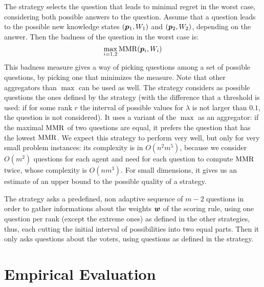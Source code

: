The  strategy selects the question that leads to minimal regret in the worst case, considering both possible answers to the question. Assume that a question leads to the possible new knowledge states $({\bm{p}}_1, W_1)$ and $({\bm{p}}_2, W_2)$, depending on the answer. Then the badness of the question in the worst case is:
\[\max_{i=1,2} \operatorname{MMR}({\bm{p}}_i,W_i) \]
This badness measure gives a way of picking questions among a set of possible questions, by picking one that minimizes the measure. Note that other aggregators than $\max$ can be used as well. The  strategy considers as possible questions the ones defined by the  strategy (with the difference that a threshold is used: if for some rank $r$ the interval of possible values for $\lambda$ is not larger than $0.1$, the question is not considered). It uses a variant of the $\max$ as an aggregator: if the maximal $\operatorname{MMR}$ of two questions are equal, it prefers the question that has the lowest $\operatorname{MMR}$. We expect this strategy to perform very well, but only for very small problem instances: its complexity is in $O(n^2 m^5)$, because we consider $O(m^2)$ questions for each agent and need for each question to compute $\operatorname{MMR}$ twice, whose complexity is $O(nm^3)$. For small dimensions, it gives us an estimate of an upper bound to the possible quality of a strategy.

The  strategy asks a predefined, non adaptive sequence of $m-2$ questions in order to gather informations about the weights $\bm{w}$ of the scoring rule, using one question per rank (except the extreme ones) as defined in the other strategies, thus, each cutting the initial interval of possibilities into two equal parts. Then it only asks questions about the voters, using questions as defined in the  strategy.


\section{Empirical Evaluation} 
\label{sec:experiments}

